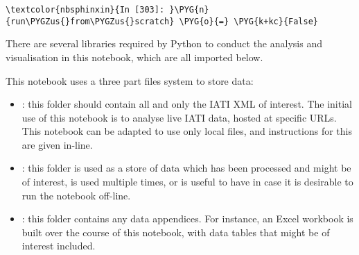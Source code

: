 \documentclass[letterpaper,10pt,english]{sphinxmanual}
\begin{document}
\begin{Verbatim}[commandchars=\\\{\}]
\textcolor{nbsphinxin}{In [303]: }\PYG{n}{run\PYGZus{}from\PYGZus{}scratch} \PYG{o}{=} \PYG{k+kc}{False}
\end{Verbatim}

There are several libraries required by Python to conduct the analysis
and visualisation in this notebook, which are all imported below.

This notebook uses a three part files system to store data:
\begin{itemize}
\item {} 
: this folder should contain all and only the IATI XML of
interest. The initial use of this notebook is to analyse live IATI
data, hosted at specific URLs. This notebook can be adapted to use
only local files, and instructions for this are given in-line.

\item {} 
: this folder is used as a store of data which
has been processed and might be of interest, is used multiple times,
or is useful to have in case it is desirable to run the notebook
off-line.

\item {} 
: this folder contains any data appendices. For
instance, an Excel workbook is built over the course of this
notebook, with data tables that might be of interest included.

\end{itemize}
\end{document}
